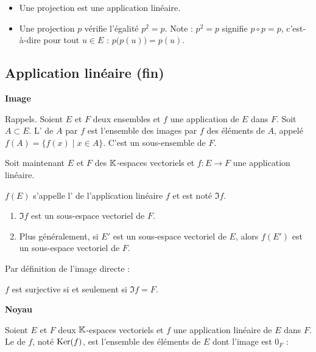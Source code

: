 \documentclass[10pt,class=article,crop=false]{standalone}
\begin{document}
\begin{multicols}{2}

\begin{itemize}
	\item Une projection est une application linéaire.
	\item Une projection $p$ vérifie l'égalité $p^2=p$.
	Note : $p^2=p$ signifie $p\circ p = p$, c'est-à-dire pour tout $u\in E$ :
	$p\big(p(u)\big) = p(u)$.
\end{itemize}


\subsection{Application linéaire (fin)}

\textbf{Image}

Rappels. Soient $E$ et $F$ deux ensembles et $f$ une application de $E$ dans $F$. Soit $A \subset  E$. L' de $A$ par $f$ est l'ensemble des images par $f$ des éléments de $A$, appelé $f(A)=\big\{ f(x)  \mid x\in A \big\}$. C'est un sous-ensemble de $F$.


Soit maintenant $E$ et $F$ des $\mathbb{K}$-espaces vectoriels
et $f : E \to F$ une application linéaire.

$f(E)$ s'appelle l' de l'application linéaire $f$ et est noté $\Im f$.


\begin{proposition}
	\sauteligne
	\begin{enumerate}
		\item $\Im f$ est un sous-espace vectoriel de $F$.
		\item Plus généralement, si $E'$ est un sous-espace vectoriel de $E$, alors $f(E')$ est un sous-espace vectoriel de $F$.
	\end{enumerate}
\end{proposition}

Par définition de l'image directe : \\
\centerline{$f$ est surjective si et seulement si $\Im f = F$.}


\textbf{Noyau}


\begin{definition}
	Soient $E$ et $F$ deux $\mathbb{K}$-espaces vectoriels et $f$ une application linéaire de $E$ dans $F$.
	Le  de $f$, noté  $\operatorname{Ker}(f)$, est l'ensemble des
	éléments de $E$ dont l'image est $0_{F}$ :
	

\end{definition}
\end{multicols}
\end{document}
